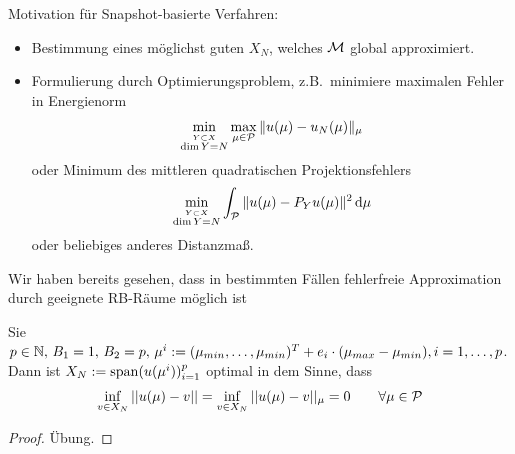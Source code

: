 Motivation für Snapshot-basierte Verfahren:
\begin{itemize}
	\item Bestimmung eines möglichst guten $X_N$, welches $\mathcal{M}$ global approximiert.
	\item Formulierung durch Optimierungsproblem, z.B.\ minimiere maximalen Fehler in Energienorm
		\begin{equation}
			\min_{\stackrel{Y \subset X}{\dim Y = N}} \max_{\mu \in \mathcal{P}} \|u(\mu)-u_N(\mu)\|_\mu \label{eq:3.7}
		\end{equation} 
		oder Minimum des mittleren quadratischen Projektionsfehlers
		\begin{equation}
			\min_{\stackrel{Y \subset X}{\dim Y = N}} \int_{\mathcal{P}} \|u(\mu)-P_Y u(\mu)\|^2 \,\mathrm{d}\mu  \label{eq:3.8}
		\end{equation} 
		oder beliebiges anderes Distanzmaß.
\end{itemize}

Wir haben bereits gesehen, dass in bestimmten Fällen fehlerfreie Approximation durch geeignete RB-Räume möglich ist

\begin{satz}[Optimales $X_N$ für Thermischer Block, $B_1 = 1$]
Sie $p \in \mathbb{N}, \, B_1=1, \, B_2 = p, \, \mu^i := (\mu_{min},\dots,\mu_{min})^T + e_i \cdot (\mu_{max} - \mu_{min}), i=1,\dots,p$. Dann ist $X_N := \operatorname{span}(u(\mu^i))_{i=1}^p$ optimal in dem Sinne, dass
\[
	\inf_{v \in X_N} ||u(\mu) - v|| = \inf_{v \in X_N} ||u(\mu) - v||_{\mu} = 0 \qquad \forall \mu \in \mathcal{P}
\] 
\end{satz}

\begin{proof}
Übung.
\end{proof}

